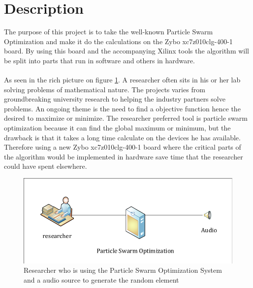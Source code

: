 \section{Description}
The purpose of this project is to take the well-known Particle Swarm Optimization \cite{Blondin2009} and make it do the calculations on the Zybo xc7z010clg-400-1 board. By using this board and the accompanying Xilinx tools the algorithm will be split into parts that run in software and others in hardware. 
\\\\
As seen in the rich picture on figure \ref{fig:descriptiondiagram}. A researcher often sits in his or her lab solving problems of mathematical nature. The projects varies from groundbreaking university research to helping the industry partners solve problems. An ongoing theme is the need to find a objective function hence the desired to maximize or minimize.
The researcher preferred tool is particle swarm optimization because it can find the global maximum or minimum, but the drawback is that it takes a long time calculate on the devices he has available. Therefore using a new Zybo xc7z010clg-400-1 board where the critical parts of the algorithm would be implemented in hardware save time that the researcher could have spent elsewhere.

\begin{figure}[!h]
	\centering
	\includegraphics[width=0.7\linewidth]{diagram/description_diagram}
	\caption{Researcher who is using the Particle Swarm Optimization System and a audio source to generate the random element }
	\label{fig:descriptiondiagram}
\end{figure}